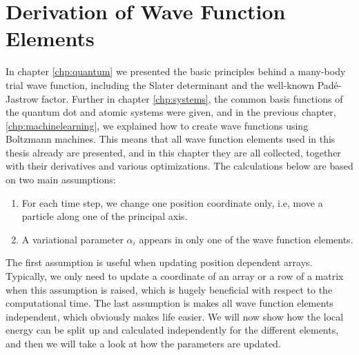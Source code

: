 \chapter{Derivation of Wave Function Elements} \label{chp:WFE}
In chapter \eqref{chp:quantum} we presented the basic principles behind a many-body trial wave function, including the Slater determinant and the well-known Padé-Jastrow factor. Further in chapter \eqref{chp:systems}, the common basis functions of the quantum dot and atomic systems were given, and in the previous chapter, \eqref{chp:machinelearning}, we explained how to create wave functions using Boltzmann machines. This means that all wave function elements used in this thesis already are presented, and in this chapter they are all collected, together with their derivatives and various optimizations. The calculations below are based on two main assumptions:
\begin{enumerate}
	\item For each time step, we change one position coordinate only, i.e, move a particle along one of the principal axis.
	\item A variational parameter $\alpha_i$ appears in only one of the wave function elements.
\end{enumerate}
The first assumption is useful when updating position dependent arrays. Typically, we only need to update a coordinate of an array or a row of a matrix when this assumption is raised, which is hugely beneficial with respect to the computational time. The last assumption is makes all wave function elements independent, which obviously makes life easier. We will now show how the local energy can be split up and calculated independently for the different elements, and then we will take a look at how the parameters are updated.

